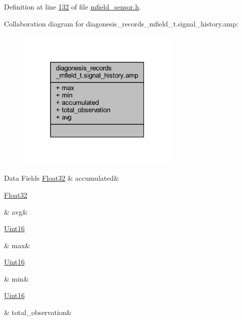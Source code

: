 Definition at line \hyperlink{a00019_source_l00132}{132} of file \hyperlink{a00019_source}{mfield\+\_\+sensor.\+h}.



Collaboration diagram for diagonesis\+\_\+records\+\_\+mfield\+\_\+t.\+signal\+\_\+history.\+amp\+:\nopagebreak
\begin{figure}[H]
\begin{center}
\leavevmode
\includegraphics[width=220pt]{db/d40/a00959}
\end{center}
\end{figure}
\begin{DoxyFields}{Data Fields}
\hypertarget{a00019_a5f926b5475963464445c0d2055786b5f}{\hyperlink{a00072_a87d38f886e617ced2698fc55afa07637}{Float32}}\label{a00019_a5f926b5475963464445c0d2055786b5f}
&
accumulated&
\\
\hline

\hypertarget{a00019_ae322d423f075b0ab2daad27011d24909}{\hyperlink{a00072_a87d38f886e617ced2698fc55afa07637}{Float32}}\label{a00019_ae322d423f075b0ab2daad27011d24909}
&
avg&
\\
\hline

\hypertarget{a00019_a2ffe4e77325d9a7152f7086ea7aa5114}{\hyperlink{a00072_a59a9f6be4562c327cbfb4f7e8e18f08b}{Uint16}}\label{a00019_a2ffe4e77325d9a7152f7086ea7aa5114}
&
max&
\\
\hline

\hypertarget{a00019_ad8bd79cc131920d5de426f914d17405a}{\hyperlink{a00072_a59a9f6be4562c327cbfb4f7e8e18f08b}{Uint16}}\label{a00019_ad8bd79cc131920d5de426f914d17405a}
&
min&
\\
\hline

\hypertarget{a00019_a5c752d693b04fadbacceeaffb3adf49a}{\hyperlink{a00072_a59a9f6be4562c327cbfb4f7e8e18f08b}{Uint16}}\label{a00019_a5c752d693b04fadbacceeaffb3adf49a}
&
total\+\_\+observation&
\\
\hline

\end{DoxyFields}
\label{d9/dad/a00394}
\hypertarget{a00019_d9/dad/a00394}{}
